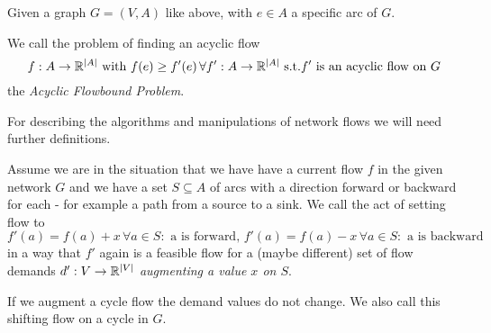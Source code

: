\begin{definition}
  Given a graph $G=(V,A)$ like above, with $e \in A$ a specific arc of $G$. 
  
We call the problem of finding an acyclic flow 
$$f:A\to\mathbb{R}^{|A|}\textrm{ with }f(e)\ge f'(e)\,\forall f':A\to\mathbb{R}^{|A|}\textrm{ s.t.} f'\textrm{ is an acyclic flow on 
}G$$
  the \textit{ Acyclic Flowbound Problem}.
\end{definition}

For describing the algorithms and manipulations of network flows we will need further definitions. 
\begin{definition}
 Assume we are in the situation that we have have a current flow $f$ in the given network $G$ and we have a set 
$S\subseteq A$ of arcs with a direction forward or backward for each - for example a path from a source to a sink. We 
call the act of setting flow to
$$f'(a)= f(a)+x \,\forall a\in S:\textrm{ a is forward, }f'(a)= f(a)-x \,\forall a\in S:\textrm{ a is backward}$$
in a way that $f'$ again is a feasible flow for a (maybe different) set of flow demands $d':V\to\mathbb{R}^{|V|}$ 
\textit{ augmenting a value $x$ on $S$}. 

If we augment a cycle flow the demand values do not change. We also call this shifting flow on a cycle in $G$.

\end{definition}


